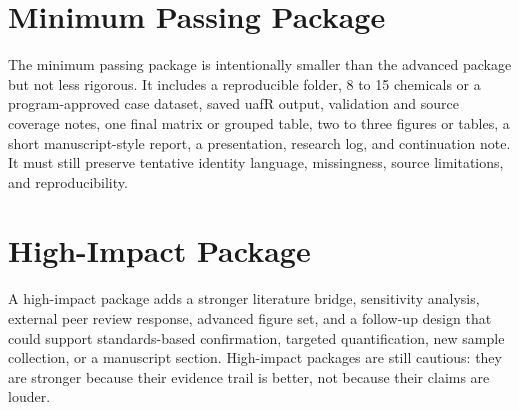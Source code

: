 \section{Minimum Passing Package}
The minimum passing package is intentionally smaller than the advanced package but not less rigorous. It includes a reproducible folder, 8 to 15 chemicals or a program-approved case dataset, saved uafR output, validation and source coverage notes, one final matrix or grouped table, two to three figures or tables, a short manuscript-style report, a presentation, research log, and continuation note. It must still preserve tentative identity language, missingness, source limitations, and reproducibility.

\section{High-Impact Package}
A high-impact package adds a stronger literature bridge, sensitivity analysis, external peer review response, advanced figure set, and a follow-up design that could support standards-based confirmation, targeted quantification, new sample collection, or a manuscript section. High-impact packages are still cautious: they are stronger because their evidence trail is better, not because their claims are louder.
